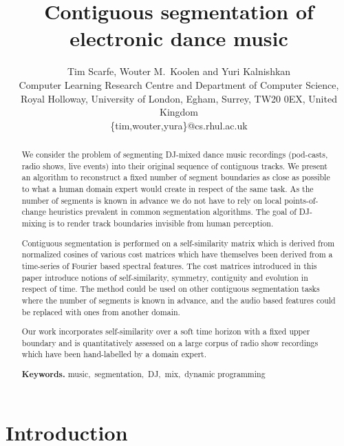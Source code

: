 \documentclass[twocolumn]{article}
\author{Tim Scarfe, Wouter M.~Koolen and Yuri Kalnishkan \\ 
	Computer Learning Research
	Centre and Department of Computer Science, \\ 
	Royal Holloway,  University of London, Egham, Surrey, TW20 0EX, United Kingdom\\
	\{tim,wouter,yura\}@cs.rhul.ac.uk
}
\title{Contiguous segmentation of electronic dance music}
\begin{document}
	
	\maketitle
	
	\begin{abstract}
		
		We consider the problem of segmenting DJ-mixed dance music recordings (pod-casts, radio shows, live events) into their original sequence of contiguous tracks. We present an algorithm to reconstruct a fixed number of segment boundaries as close as possible to what a human domain expert would create in respect of the same task. As the number of segments is known in advance we do not have to rely on local points-of-change heuristics prevalent in common segmentation algorithms. The goal of DJ-mixing is to render track boundaries  invisible from human perception.
		
		Contiguous segmentation is performed on a self-similarity matrix which is derived from normalized cosines of various cost matrices which have themselves been derived from a time-series of Fourier based spectral features. The cost matrices introduced in this paper introduce notions of self-similarity, symmetry, contiguity and evolution in respect of time. The method could be used on other contiguous segmentation tasks where the number of segments is known in advance, and the audio based features could be replaced with ones from another domain.
		
		Our work incorporates self-similarity over a soft time horizon with a fixed upper boundary and is quantitatively assessed on a large corpus of radio show recordings which have been hand-labelled by a domain expert.
		\smallskip
		
		\noindent \textbf{Keywords.} \noindent music,~segmentation,~DJ,~mix,~dynamic programming
		
	\end{abstract}
	
	
	\vspace{1em}
	
	\section{Introduction}
	
\end{document}
